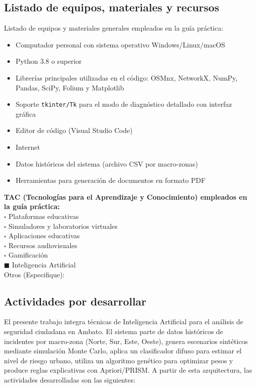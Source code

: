 \documentclass[11pt]{article}
\begin{document}
\subsection{Listado de equipos, materiales y recursos}
Listado de equipos y materiales generales empleados en la guía práctica:\\
\begin{itemize}
    \item Computador personal con sistema operativo Windows/Linux/macOS
    \item Python 3.8 o superior
    \item Librerías principales utilizadas en el código: OSMnx, NetworkX, NumPy, Pandas, SciPy, Folium y Matplotlib
    \item Soporte \texttt{tkinter/Tk} para el modo de diagnóstico detallado con interfaz gráfica
    \item Editor de código (Visual Studio Code)
    \item Internet
    \item Datos históricos del sistema (archivo CSV por macro-zonas)
    \item Herramientas para generación de documentos en formato PDF
\end{itemize} 

\textbf{TAC (Tecnologías para el Aprendizaje y Conocimiento) empleados en la guía práctica:}\\
$\square$ Plataformas educativas \\
$\square$ Simuladores y laboratorios virtuales \\
$\square$ Aplicaciones educativas \\
$\square$ Recursos audiovisuales \\
$\square$ Gamificación \\
$\blacksquare$ Inteligencia Artificial \\
Otros (Especifique): \underline{\hspace{5cm}} \\


\subsection{Actividades por desarrollar}

El presente trabajo integra técnicas de Inteligencia Artificial para el análisis de seguridad ciudadana en Ambato. El sistema parte de datos históricos de incidentes por macro-zona (Norte, Sur, Este, Oeste), genera escenarios sintéticos mediante simulación Monte Carlo, aplica un clasificador difuso para estimar el nivel de riesgo urbano, utiliza un algoritmo genético para optimizar pesos y produce reglas explicativas con Apriori/PRISM. A partir de esta arquitectura, las actividades desarrolladas son las siguientes:
\end{document}
